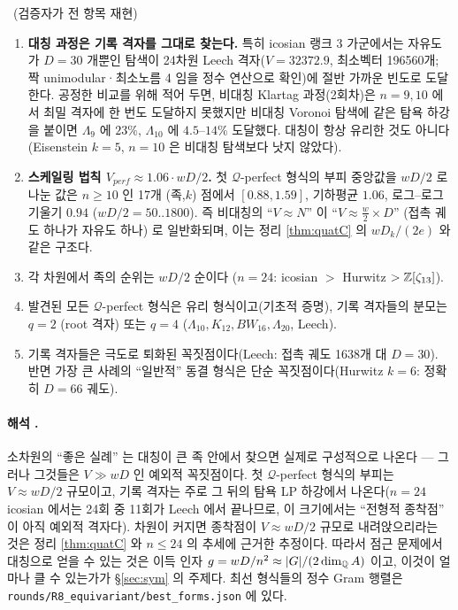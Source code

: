 \begin{observation}\tagN\ (검증자가 전 항목 재현)
\begin{enumerate}
\item \textbf{대칭 과정은 기록 격자를 그대로 찾는다.} 특히 icosian 랭크 3 가군에서는 자유도가 $D=30$ 개뿐인 탐색이 24차원 Leech 격자($V=32372.9$, 최소벡터 196560개; 짝 unimodular·최소노름 4 임을 정수 연산으로 확인)에 절반 가까운 빈도로 도달한다. 공정한 비교를 위해 적어 두면, 비대칭 Klartag 과정(2회차)은 $n=9,10$ 에서 최밀 격자에 한 번도 도달하지 못했지만 비대칭 Voronoi 탐색에 같은 탐욕 하강을 붙이면 $\Lambda_9$ 에 $23\%$, $\Lambda_{10}$ 에 $4.5$--$14\%$ 도달했다. 대칭이 항상 유리한 것도 아니다(Eisenstein $k=5$, $n=10$ 은 비대칭 탐색보다 낫지 않았다).
\item \textbf{스케일링 법칙 $V_{perf}\approx1.06\cdot wD/2$.} 첫 $\mathcal Q$-perfect 형식의 부피 중앙값을 $wD/2$ 로 나눈 값은 $n\ge10$ 인 17개 (족,$k$) 점에서 $[0.88,1.59]$, 기하평균 $1.06$, 로그--로그 기울기 $0.94$ ($wD/2=50..1800$). 즉 비대칭의 ``$V\approx N$'' 이 ``$V\approx\tfrac w2\times D$'' (접촉 궤도 하나가 자유도 하나) 로 일반화되며, 이는 정리 \ref{thm:quatC} 의 $wD_k/(2e)$ 와 같은 구조다.
\item 각 차원에서 족의 순위는 $wD/2$ 순이다 ($n=24$: icosian $>$ Hurwitz $>\mathbb{Z}[\zeta_{13}]$).
\item 발견된 모든 $\mathcal Q$-perfect 형식은 유리 형식이고(기초적 증명), 기록 격자들의 분모는 $q=2$ (root 격자) 또는 $q=4$ ($\Lambda_{10},K_{12},BW_{16},\Lambda_{20}$, Leech).
\item 기록 격자들은 극도로 퇴화된 꼭짓점이다(Leech: 접촉 궤도 1638개 대 $D=30$). 반면 가장 큰 사례의 ``일반적'' 동결 형식은 단순 꼭짓점이다(Hurwitz $k=6$: 정확히 $D=66$ 궤도).
\end{enumerate}
\end{observation}
\paragraph{해석 \tagH.} 소차원의 ``좋은 실례'' 는 대칭이 큰 족 안에서 찾으면 실제로 구성적으로 나온다 --- 그러나 그것들은 $V\gg wD$ 인 예외적 꼭짓점이다. 첫 $\mathcal Q$-perfect 형식의 부피는 $V\approx wD/2$ 규모이고, 기록 격자는 주로 그 뒤의 탐욕 LP 하강에서 나온다($n=24$ icosian 에서는 24회 중 11회가 Leech 에서 끝나므로, 이 크기에서는 ``전형적 종착점'' 이 아직 예외적 격자다). 차원이 커지면 종착점이 $V\approx wD/2$ 규모로 내려앉으리라는 것은 정리 \ref{thm:quatC} 와 $n\le24$ 의 추세에 근거한 추정이다. 따라서 점근 문제에서 대칭으로 얻을 수 있는 것은 이득 인자 $g=wD/n^2\approx|G|/(2\dim_{\mathbb{Q}} A)$ 이고, 이것이 얼마나 클 수 있는가가 \S\ref{sec:sym} 의 주제다. 최선 형식들의 정수 Gram 행렬은 \texttt{rounds/R8\_equivariant/best\_forms.json} 에 있다.

